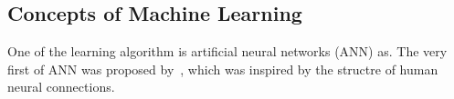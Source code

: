\subsection{Concepts of Machine Learning}
One of the learning algorithm is artificial neural networks (ANN) as. The very first of ANN was proposed by~\citet{McCulloch_1943}, which was inspired by the structre of human neural connections. 